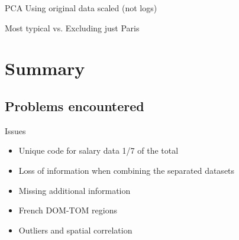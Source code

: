 \documentclass[12pt]{beamer}
\begin{document}


\begin{frame}{\textcolor{bscuro}{PCA}}
	Using original data scaled (not logs)
	
	Most typical vs. Excluding just Paris
	\begin{figure} 
		\centering
	\end{figure}
\end{frame}


\section{Summary}


\subsection{Problems encountered}


\begin{frame}{\textcolor{bscuro}{Issues}}
	\begin{itemize}
		\item Unique code for salary data 1/7 of the total 
		\item Loss of information when combining the separated datasets
		\item Missing additional information 
		\item French DOM-TOM regions
		\item Outliers and spatial correlation
	\end{itemize}
\end{frame}			
\end{document}
